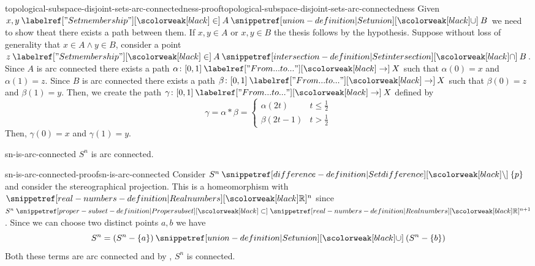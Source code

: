 \documentclass[preview]{standalone}
\begin{document}
\begin{snippetproof}{topological-subspace-disjoint-sets-arc-connectedness-proof}{topological-subspace-disjoint-sets-arc-connectedness}{}
    Given \(x,y \in A \union B\) we need to show theat there exists a path between them.
    If \(x,y \in A\) or \(x,y \in B\) the thesis follows by the hypothesis.
    Suppose without loss of generality that \(x\in A \land y \in B\),
    consider a point \(z \in A \intersection B\).
    Since \(A\) is arc connected there exists a path \(\alpha \colon [0,1] \fromto X\)
    such that \(\alpha(0) = x\) and \(\alpha(1) = z\).
    Since \(B\) is arc connected there exists a path \(\beta \colon [0,1] \fromto X\)
    such that \(\beta(0) = z\) and \(\beta(1) = y\).
    Then, we create the path \(\gamma \colon [0,1] \fromto X\)
    defined by \[
        \gamma = \alpha \ast \beta = \begin{cases}
            \alpha(2t) & t \leq \frac{1}{2} \\
            \beta(2t-1) & t > \frac{1}{2}
        \end{cases}
    \]
    Then,
    \(\gamma(0) = x\) and \(\gamma(1) = y\).
\end{snippetproof}

\begin{snippetproposition}{sn-is-arc-connected}{}
    \(S^n\) is arc connected.
\end{snippetproposition}

\begin{snippetproof}{sn-is-arc-connected-proof}{sn-is-arc-connected}{}
    Consider \(S^n \difference \{p\}\) and consider the stereographical projection.
    This is a homeomorphism with \(\realnumbers^n\) since \(S^n \subset \realnumbers^{n+1}\).
    Since we can choose two distinct points \(a, b\) we have
    \[
        S^n = (S^n - \{a\}) \union (S^n - \{b\})
    \]
    Both these terms are arc connected and by ,
    \(S^n\) is connected.
\end{snippetproof}


\end{document}
